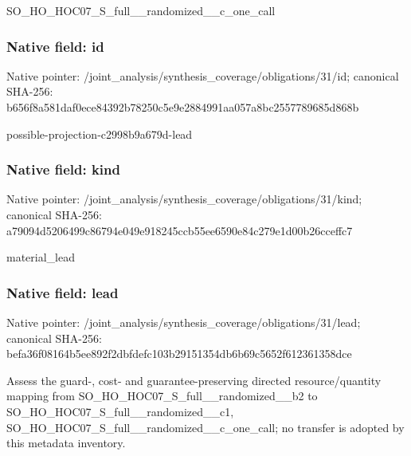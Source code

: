 \documentclass[10pt,a4paper]{article}
\begin{document}
\begingroup\raggedright\sloppy SO\_\allowbreak{}HO\_\allowbreak{}HOC07\_\allowbreak{}S\_\allowbreak{}full\_\allowbreak{}\_\allowbreak{}randomized\_\allowbreak{}\_\allowbreak{}c\_\allowbreak{}one\_\allowbreak{}call\par\endgroup

\subsubsection{Native field: id}
Native pointer: /joint\_\allowbreak{}analysis/synthesis\_\allowbreak{}coverage/obligations/31/id; canonical SHA-256: b656f8a581daf0ece84392b78250c5e9e2884991aa057a8bc2557789685d868b

\begingroup\raggedright\sloppy possible-projection-c2998b9a679d-lead\par\endgroup

\subsubsection{Native field: kind}
Native pointer: /joint\_\allowbreak{}analysis/synthesis\_\allowbreak{}coverage/obligations/31/kind; canonical SHA-256: a79094d5206499c86794e049e918245ccb55ee6590e84c279e1d00b26cceffc7

\begingroup\raggedright\sloppy material\_\allowbreak{}lead\par\endgroup

\subsubsection{Native field: lead}
Native pointer: /joint\_\allowbreak{}analysis/synthesis\_\allowbreak{}coverage/obligations/31/lead; canonical SHA-256: befa36f08164b5ee892f2dbfdefc103b29151354db6b69c5652f612361358dce

\begingroup\raggedright\sloppy Assess the guard-,\allowbreak{} cost- and guarantee-preserving directed resource/\allowbreak{}quantity mapping from SO\_\allowbreak{}HO\_\allowbreak{}HOC07\_\allowbreak{}S\_\allowbreak{}full\_\allowbreak{}\_\allowbreak{}randomized\_\allowbreak{}\_\allowbreak{}b2 to SO\_\allowbreak{}HO\_\allowbreak{}HOC07\_\allowbreak{}S\_\allowbreak{}full\_\allowbreak{}\_\allowbreak{}randomized\_\allowbreak{}\_\allowbreak{}c1,\allowbreak{} SO\_\allowbreak{}HO\_\allowbreak{}HOC07\_\allowbreak{}S\_\allowbreak{}full\_\allowbreak{}\_\allowbreak{}randomized\_\allowbreak{}\_\allowbreak{}c\_\allowbreak{}one\_\allowbreak{}call;\allowbreak{} no transfer is adopted by this metadata inventory.\par\endgroup
\end{document}

